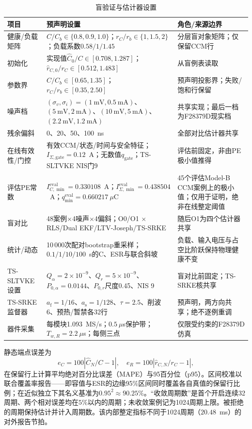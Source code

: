 \documentclass[zihao=5,a4paper]{ctexart}
\newcommand{\TSKF}{TS-SLTVKE}
\newcommand{\TSSRKE}{TS-SRKE}
\begin{document}
\begin{table}[t]
\caption{盲验证与估计器设置}
\label{tab:verification_settings}
\centering
\setlength{\tabcolsep}{4pt}
\small
\begin{tabular}{p{2.6cm}p{6.2cm}p{6.2cm}}
\toprule
项目 & 预声明设置 & 角色/来源边界 \\
\midrule
健康/负载矩阵 & $C/C_b\in\{0.8,0.9,1.0\}$；$r_C/r_b\in\{1,1.5,2\}$；负载系数$0.58/1/1.45$ & 分层盲对象矩阵；仅保留CCM行 \\
初始化 & 实现值$\hat C_0/C\in[0.708,1.287]$；$\hat r_{C,0}/r_C\in[0.512,1.483]$ & 从盲例表读取 \\
参数界 & $C/C_b\in[0.65,1.35]$；$r_C/r_b\in[0.35,2.50]$ & 预声明投影界；失败/饱和行保留 \\
噪声档 & $(\sigma_v,\sigma_i)=(1~\mathrm{mV},0.5~\mathrm{mA})$、$(5~\mathrm{mV},2~\mathrm{mA})$、$(10~\mathrm{mV},5~\mathrm{mA})$、$(2.2~\mathrm{mV},1.2~\mathrm{mA})$ & 共享实现；最后一档为F28379D现实档 \\
残余偏斜 & 0、20、50、100~ns & 全部对比估计器共享 \\
在线有效性/门控 & 有效CCM/状态/时间与安全特征；$I_{\Sigma,\mathrm{gate}}=0.12$~A；无数值$q_{\mathrm{gate}}$；\TSKF{} NIS门9 & 评估前固定，非由PE极小值推得 \\
评估PE常数 & $I_{C,\min}^{\mathrm{eval}}=0.330108$~A；$I_{\Sigma,\min}^{\mathrm{eval}}=0.438504$~A；$q_{\min}^{\mathrm{eval}}=0.660217~\mu$C & 45个评估Model-B CCM案例上的极小值；仅用于证明，绝非在线整定阈值 \\
盲对比 & 48案例$\times$4噪声$\times$4偏斜；O0/O1 $\times$ RLS/Dual EKF/LTV-Joseph/\TSSRKE{} & 随后O1为四个估计器共享 \\
统计/动态 & 10\,000次配对bootstrap重采样；$0.1/1/10/100$~s的C、ESR与联合斜坡 & 负载、输入电压与占空比阶跃保持物理健康不变 \\
\TSKF{}设置 & $Q_\alpha=2\times10^{-9}$、$Q_r=5\times10^{-9}$、$P_{0,\alpha}=0.0144$、$P_{0,r}$尺度0.45、NIS 9 & 盲对比前固定；\TSSRKE{}核共享 \\
\TSSRKE{}监督器 & $a_{\mathrm f}=1/16$、$a_{\mathrm s}=1/128$、$\tau=2.5$、削波6、预热/暂禁各32行 & 预声明，两方向共享；绝不逐例重调 \\
器件采集 & 每模块1.093~MS/s；$0.5~\mu$s保护带；$T_{w,R}=2.2~\mu$s；每侧三点 & 仅限受约束的F28379D仿真 \\
\bottomrule
\end{tabular}
\end{table}

静态端点误差为
\begin{equation}
e_C=100\left|\hat C_N/C-1\right|,\quad
e_R=100\left|\hat r_{C,N}/r_C-1\right|,
\end{equation}
在保留行上计算平均绝对百分比误差（MAPE）与95百分位（p95）。区间校准以联合覆盖率报告——即容值与ESR的边缘95\%区间同时覆盖各自真值的保留行比例；在近似独立下其名义基准为$0.95^2\approx90.25\%$。“收敛周期数”是首个开启连续32周期、两个相对误差均在$5\%$以内的周期；未收敛案例记为1024周期上限。被拒绝的周期保持估计并计入周期数。该内部整定指标不同于1024周期（$20.48$~ms）的对外报告节拍。
\end{document}
